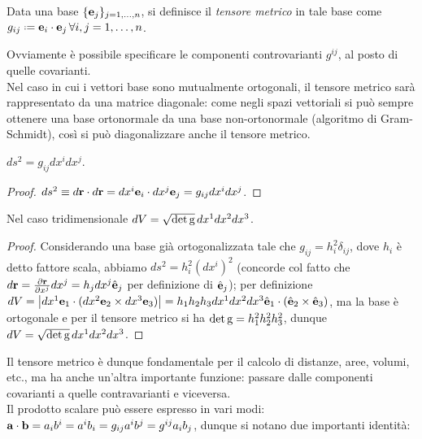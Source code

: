\begin{definition}
	Data una base $ \{\mathbf{e}_j\}_{j=1,\dots,n} $, si definisce il \textit{tensore metrico} in tale base come $ g_{ij} \defeq \ve{e}_i \cdot \ve{e}_j \, \forall i,j = 1,\dots,n$.
\end{definition}

Ovviamente è possibile specificare le componenti controvarianti $ g^{ij} $, al posto di quelle covarianti. \\
Nel caso in cui i vettori base sono mutualmente ortogonali, il tensore metrico sarà rappresentato da una matrice diagonale: come negli spazi vettoriali si può sempre ottenere una base ortonormale da una base non-ortonormale (algoritmo di Gram-Schmidt), così si può diagonalizzare anche il tensore metrico.

\begin{proposition}
	$ ds^2 = g_{ij} dx^i dx^j $.
\end{proposition}
\begin{proof}
	$ ds^2 \equiv d\mathbf{r} \cdot d\mathbf{r} = dx^i \mathbf{e}_i \cdot dx^j \mathbf{e}_j = g_{ij} dx^i dx^j $.
\end{proof}

\begin{proposition}
	Nel caso tridimensionale $ dV = \sqrt{\det\mathbf{\text{g}}}\, dx^1 dx^2 dx^3 $.
\end{proposition}
\begin{proof}
	Considerando una base già ortogonalizzata tale che $ g_{ij} = h_i^2 \delta_{ij} $, dove $ h_i $ è detto fattore scala, abbiamo $ ds^2 = h_i^2 (dx^i)^2 $ (concorde col fatto che $ d\mathbf{r} = \frac{\partial \mathbf{r}}{\partial x^j} dx^j = h_j dx^j \hat{\mathbf{e}}_j $ per definizione di $ \hat{\mathbf{e}}_j $); per definizione $ dV = \left\lvert dx^1\mathbf{e}_1 \cdot (dx^2\mathbf{e}_2 \times dx^3\mathbf{e}_3)\right\rvert = h_1 h_2 h_3 dx^1 dx^2 dx^3 \hat{\mathbf{e}}_1 \cdot (\hat{\mathbf{e}}_2 \times \hat{\mathbf{e}}_3) $, ma la base è ortogonale e per il tensore metrico si ha $ \det\mathbf{\text{g}} = h_1^2 h_2^2 h_3^2 $, dunque $ dV = \sqrt{\det\mathbf{\text{g}}}\, dx^1 dx^2 dx^3 $.
\end{proof}

Il tensore metrico è dunque fondamentale per il calcolo di distanze, aree, volumi, etc., ma ha anche un'altra importante funzione: passare dalle componenti covarianti a quelle contravarianti e viceversa.\\
Il prodotto scalare può essere espresso in vari modi: $ \mathbf{a}\cdot\mathbf{b} = a_i b^i = a^i b_i = g_{ij} a^i b^j = g^{ij} a_i b_j $, dunque si notano due importanti identità:

